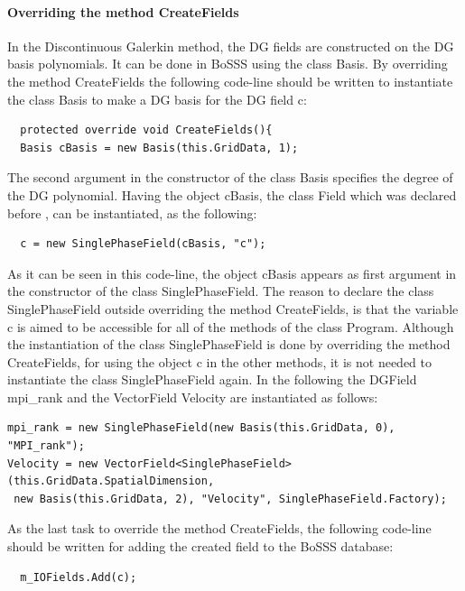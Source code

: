 \documentclass[11pt,twoside,a4paper]{fdyartcl}
\begin{document}
{\paragraph{Overriding the method {\scriptsize CreateFields}}
In the Discontinuous Galerkin method, the DG fields are constructed on the DG basis polynomials. It can be done in BoSSS using the class {\scriptsize Basis}. By overriding the method {\scriptsize CreateFields} the following code-line should be written to instantiate the class {\scriptsize Basis} to make a DG basis for the DG field {\scriptsize c}:
{\scriptsize \begin{verbatim}
  protected override void CreateFields(){
  Basis cBasis = new Basis(this.GridData, 1);
\end{verbatim}}
The second argument in the constructor of the class {\scriptsize Basis} specifies the degree of the DG polynomial. Having the object {\scriptsize cBasis}, the class {\scriptsize Field} which was declared before , can be instantiated, as the following:
{\scriptsize \begin{verbatim}
  c = new SinglePhaseField(cBasis, "c");
\end{verbatim}}
As it can be  seen in this code-line, the object {\scriptsize cBasis} appears as first argument in the constructor of the class {\scriptsize SinglePhaseField}. The reason to declare the class {\scriptsize SinglePhaseField} outside overriding the method {\scriptsize CreateFields}, is that the variable {\scriptsize c} is aimed to be accessible for all of the methods of the class {\scriptsize Program}. Although the instantiation of the class {\scriptsize SinglePhaseField} is done by overriding the method {\scriptsize CreateFields}, for using the object {\scriptsize c} in the other methods, it is not needed to instantiate the class {\scriptsize SinglePhaseField} again. In the following the {\scriptsize DGField mpi\_rank} and the {\scriptsize VectorField Velocity} are instantiated as follows:
{\scriptsize} \begin{verbatim}
mpi_rank = new SinglePhaseField(new Basis(this.GridData, 0), "MPI_rank");
Velocity = new VectorField<SinglePhaseField>(this.GridData.SpatialDimension,
 new Basis(this.GridData, 2), "Velocity", SinglePhaseField.Factory);
\end{verbatim}
As the last task to override the method {\scriptsize CreateFields}, the following code-line should be written for adding the created field to the BoSSS database:
{\scriptsize \begin{verbatim}
  m_IOFields.Add(c);
\end{verbatim}}
}
\end{document}
